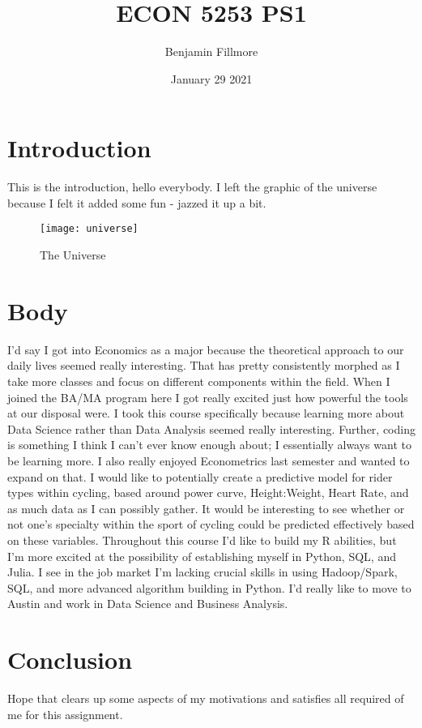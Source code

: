 \documentclass{article}
\title{ECON 5253 PS1}
\author{Benjamin Fillmore}
\date{January 29 2021}
\begin{document}
\maketitle

\section{Introduction}
This is the introduction, hello everybody. I left the graphic of the universe because I felt it added some fun - jazzed it up a bit.

\begin{figure}[h!]
\centering
\texttt{[image: universe]}
\caption{The Universe}
\label{fig:universe}
\end{figure}

\section{Body}
I'd say I got into Economics as a major because the theoretical approach to our daily lives seemed really interesting. That has pretty consistently morphed as I take more classes and focus on different components within the field. When I joined the BA/MA program here I got really excited just how powerful the tools at our disposal were. I took this course specifically because learning more about Data Science rather than Data Analysis seemed really interesting. Further, coding is something I think I can't ever know enough about; I essentially always want to be learning more. I also really enjoyed Econometrics last semester and wanted to expand on that. I would like to potentially create a predictive model for rider types within cycling, based around power curve, Height:Weight, Heart Rate, and as much data as I can possibly gather. It would be interesting to see whether or not one's specialty within the sport of cycling could be predicted effectively based on these variables. Throughout this course I'd like to build my R abilities, but I'm more excited at the possibility of establishing myself in Python, SQL, and Julia. I see in the job market I'm lacking crucial skills in using Hadoop/Spark, SQL, and more advanced algorithm building in Python. I'd really like to move to Austin and work in Data Science and Business Analysis. 

\section{Conclusion}
Hope that clears up some aspects of my motivations and satisfies all required of me for this assignment.
\end{document}

